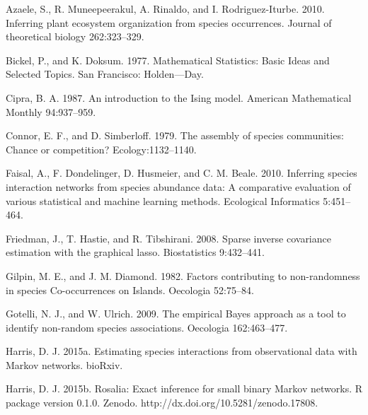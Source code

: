 \documentclass[12pt,]{article}
\begin{document}
\begin{spacing}{1.9}
\begin{flushleft}
Azaele, S., R. Muneepeerakul, A. Rinaldo, and I. Rodriguez-Iturbe. 2010.
Inferring plant ecosystem organization from species occurrences. Journal
of theoretical biology 262:323--329.

Bickel, P., and K. Doksum. 1977. Mathematical Statistics: Basic Ideas
and Selected Topics. San Francisco: Holden---Day.

Cipra, B. A. 1987. An introduction to the Ising model. American
Mathematical Monthly 94:937--959.

Connor, E. F., and D. Simberloff. 1979. The assembly of species
communities: Chance or competition? Ecology:1132--1140.

Faisal, A., F. Dondelinger, D. Husmeier, and C. M. Beale. 2010.
Inferring species interaction networks from species abundance data: A
comparative evaluation of various statistical and machine learning
methods. Ecological Informatics 5:451--464.

Friedman, J., T. Hastie, and R. Tibshirani. 2008. Sparse inverse
covariance estimation with the graphical lasso. Biostatistics
9:432--441.

Gilpin, M. E., and J. M. Diamond. 1982. Factors contributing to
non-randomness in species Co-occurrences on Islands. Oecologia
52:75--84.

Gotelli, N. J., and W. Ulrich. 2009. The empirical Bayes approach as a
tool to identify non-random species associations. Oecologia
162:463--477.

Harris, D. J. 2015a. Estimating species interactions from observational
data with Markov networks. bioRxiv.

Harris, D. J. 2015b. Rosalia: Exact inference for small binary Markov
networks. R package version 0.1.0. Zenodo.
http://dx.doi.org/10.5281/zenodo.17808.


\end{flushleft}
\end{spacing}
\end{document}
